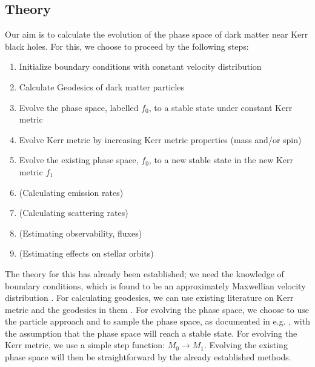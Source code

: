 \documentclass[a4paper,10pt]{article}
\begin{document}
\subsection{Theory}


Our aim is to calculate the evolution of the phase space of dark matter near Kerr black holes. For this, we choose to proceed by the 
following steps:

\begin{enumerate}
 \item Initialize boundary conditions with constant velocity distribution
 \item Calculate Geodesics of dark matter particles
 \item Evolve the phase space, labelled $f_0$, to a stable state under constant Kerr metric %
 \item Evolve Kerr metric by increasing Kerr metric properties (mass and/or spin)
 \item Evolve the existing phase space, $f_0$, to a new stable state in the new Kerr metric $f_1$
 \item (Calculating emission rates) %
 \item (Calculating scattering rates) %
 \item (Estimating observability, fluxes) %
 \item (Estimating effects on stellar orbits) %
\end{enumerate}

The theory for this has already been established; we need the knowledge of boundary conditions, which is found to be 
an approximately Maxwellian velocity distribution \citep{dm_halo_maxwellian}. For calculating geodesics, we can use 
existing literature on Kerr metric and the geodesics in them \citep{does_this_even_need_a_citation}. For evolving 
the phase space, we choose to use the particle approach and to sample the phase space, as documented in e.g. 
\citep{schnittman2015}\citep{any_vlasov_PIC_paper}, with the assumption that the phase space will 
reach a stable state. For evolving the Kerr metric, we use a simple step function: $M_0 \rightarrow M_1$. Evolving 
the existing phase space will then be straightforward by the already established methods.
\end{document}
